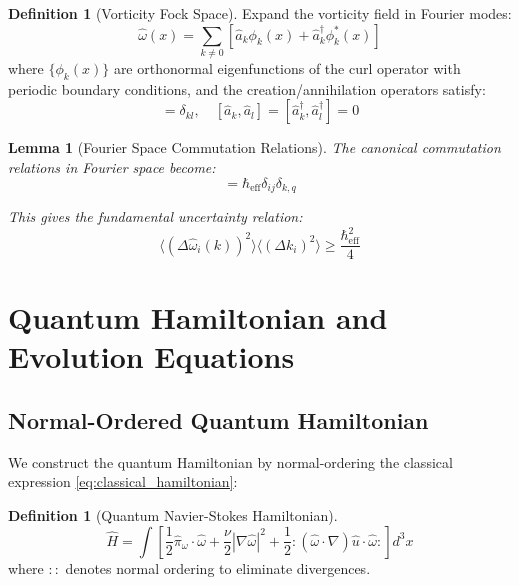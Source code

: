 \documentclass[11pt,a4paper]{article}
\newtheorem{lemma}[theorem]{Lemma}
\theoremstyle{definition}
\newtheorem{definition}[theorem]{Definition}
\theoremstyle{remark}
\newcommand{\heff}{\hbar_{\text{eff}}}
\newcommand{\omegahat}{\hat{\omega}}
\newcommand{\uhat}{\hat{u}}
\newcommand{\pihat}{\hat{\pi}}
\newcommand{\avg}[1]{\langle #1 \rangle}
\begin{document}
\begin{definition}[Vorticity Fock Space]
\label{def:fock_space}
Expand the vorticity field in Fourier modes:
\begin{equation}
\omegahat(x) = \sum_{k \neq 0} \left[\hat{a}_k \phi_k(x) + \hat{a}_k^\dagger \phi_k^*(x)\right]
\label{eq:mode_expansion}
\end{equation}
where $\{\phi_k(x)\}$ are orthonormal eigenfunctions of the curl operator with periodic boundary conditions, and the creation/annihilation operators satisfy:
\begin{equation}
[\hat{a}_k, \hat{a}_l^\dagger] = \delta_{kl}, \quad [\hat{a}_k, \hat{a}_l] = [\hat{a}_k^\dagger, \hat{a}_l^\dagger] = 0
\label{eq:creation_annihilation}
\end{equation}
\end{definition}

\begin{lemma}[Fourier Space Commutation Relations]
\label{lem:fourier_commutation}
The canonical commutation relations in Fourier space become:
\begin{equation}
[\omegahat_i(k), \omegahat_j^\dagger(q)] = \heff \delta_{ij} \delta_{k,q}
\label{eq:fourier_commutation}
\end{equation}

This gives the fundamental uncertainty relation:
\begin{equation}
\avg{(\Delta \omegahat_i(k))^2} \avg{(\Delta k_i)^2} \geq \frac{\heff^2}{4}
\label{eq:uncertainty_relation}
\end{equation}
\end{lemma}

\section{Quantum Hamiltonian and Evolution Equations}

\subsection{Normal-Ordered Quantum Hamiltonian}

We construct the quantum Hamiltonian by normal-ordering the classical expression \eqref{eq:classical_hamiltonian}:

\begin{definition}[Quantum Navier-Stokes Hamiltonian]
\label{def:quantum_hamiltonian}
\begin{equation}
\hat{H} = \int \left[\frac{1}{2}\pihat_\omega \cdot \omegahat + \frac{\nu}{2}|\nabla \omegahat|^2 + \frac{1}{2}:(\omegahat \cdot \nabla)\uhat \cdot \omegahat:\right] d^3x
\label{eq:quantum_hamiltonian}
\end{equation}
where $::$ denotes normal ordering to eliminate divergences.
\end{definition}
\end{document}
